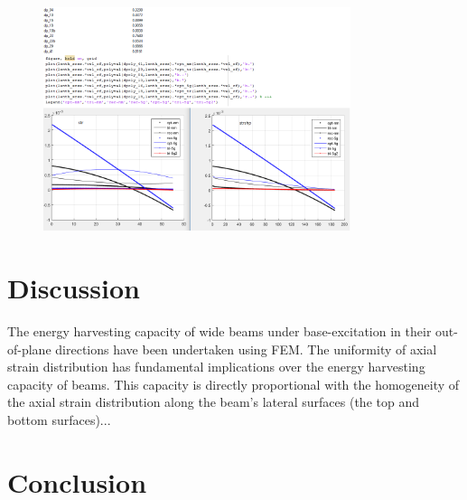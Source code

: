 \documentclass{article}
\begin{document}
\begin{figure}[ht!]
\centering
\includegraphics[width=90mm]{figures/adsiz.PNG}
\caption{ \label{overflow}}
\end{figure}
\label{sec intro}

\section{Discussion} 
The energy harvesting capacity of wide beams under base-excitation in their out-of-plane directions have been undertaken using FEM. The uniformity of axial strain distribution has fundamental implications over the energy harvesting capacity of beams. This capacity is directly proportional with the homogeneity of the axial strain distribution along the beam's lateral surfaces (the top and bottom surfaces)...



\section{Conclusion}

  
\end{document}
